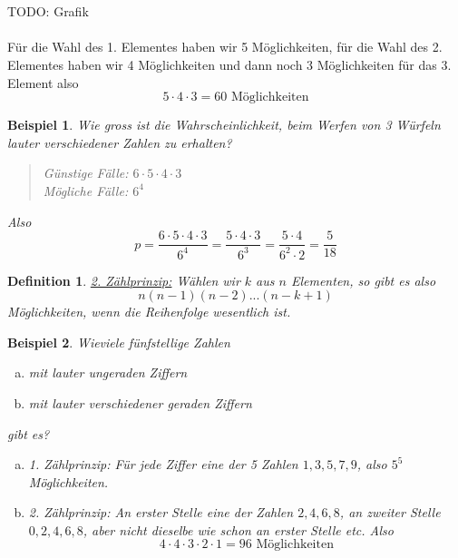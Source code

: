 \documentclass{report}
\newtheorem{mydef}{Definition}
\newtheorem{myexample}{Beispiel}
\begin{document}
\\\\TODO: Grafik\\\\
Für die Wahl des 1. Elementes haben wir 5 Möglichkeiten, für die Wahl des 2. Elementes haben wir 4 Möglichkeiten und dann noch 3 Möglichkeiten für das 3. Element also
\begin{equation}
5 \cdot 4 \cdot 3 = 60 \mbox{ Möglichkeiten}
\end{equation}
\begin{myexample}
Wie gross ist die Wahrscheinlichkeit, beim Werfen von 3 Würfeln lauter verschiedener Zahlen zu erhalten?
\begin{quote}
Günstige Fälle: $6 \cdot 5 \cdot 4 \cdot 3$\\
Mögliche Fälle: $6^4$
\end{quote}
Also
\begin{equation}
p = \frac{6 \cdot 5 \cdot 4 \cdot 3}{6^4} = \frac{5 \cdot 4 \cdot 3}{6^3} = \frac{5 \cdot 4}{6^2 \cdot 2} = \frac{5}{18}
\end{equation}
\end{myexample}
\begin{mydef}
\underline{2. Zählprinzip:} Wählen wir $k$ aus $n$ Elementen, so gibt es also
\begin{equation}
n (n-1) (n-2) ... (n-k+1)
\end{equation}
Möglichkeiten, wenn die Reihenfolge wesentlich ist.
\end{mydef}
\begin{myexample}
Wieviele fünfstellige Zahlen
\begin{enumerate}[(a)]
\item
mit lauter ungeraden Ziffern
\item
mit lauter verschiedener geraden Ziffern
\end{enumerate}
gibt es?
\begin{enumerate}[(a)]
\item
1. Zählprinzip: Für jede Ziffer eine der 5 Zahlen $1,3,5,7,9$, also $5^5$ Möglichkeiten.
\item
2. Zählprinzip: An erster Stelle eine der Zahlen $2,4,6,8$, an zweiter Stelle $0,2,4,6,8$, aber nicht dieselbe wie schon an erster Stelle etc. Also
\begin{equation}
4 \cdot 4 \cdot 3 \cdot 2 \cdot 1 = 96 \mbox{ Möglichkeiten}
\end{equation}
\end{enumerate}
\end{myexample}
\end{document}
